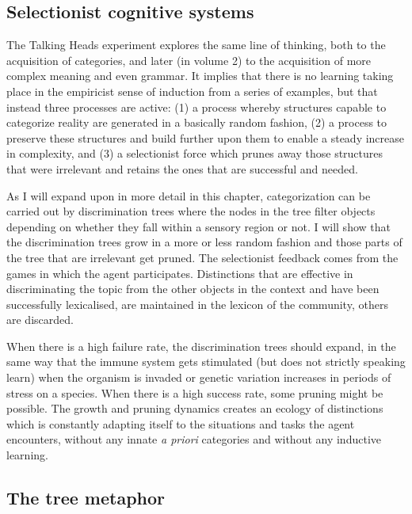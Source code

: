 \subsection{Selectionist cognitive systems}

The Talking Heads experiment explores the same line of thinking, 
both to the acquisition of categories, and later
(in volume 2) to the acquisition of more complex meaning 
and even grammar. It implies
that there is no learning taking place in the empiricist sense 
of induction from a series of examples, but that instead 
three processes are active: 
(1) a process whereby structures capable to categorize
reality are generated in a basically random fashion, 
(2) a process to preserve these structures and build 
further upon them to enable a steady increase in 
complexity, and (3) a selectionist force which
prunes away those structures that were irrelevant and 
retains the ones that are successful and needed. 

As I will expand upon in more detail in this 
chapter, categorization
can be carried out by discrimination trees where the 
nodes in the tree filter objects depending on whether they 
fall within a sensory region or not. I will show that
the discrimination trees grow in a more or
less random fashion and 
those parts of the tree that are irrelevant get pruned. 
The selectionist feedback comes from the games in which 
the agent participates. Distinctions that are effective
in discriminating the topic from the other objects in 
the context and have been successfully lexicalised, 
are maintained in the lexicon of the
community, others are discarded.

When there is a high failure rate, the discrimination trees 
should expand, in the same way that the immune system gets 
stimulated (but does not strictly speaking
learn) when the organism is
invaded or genetic variation increases in periods
of stress on a species. When there is a high
success rate, some pruning
might be possible. The growth and pruning dynamics creates an 
ecology of distinctions which is constantly 
adapting itself to the situations and tasks 
the agent encounters, without any innate {\it a priori}
categories and without any inductive learning. 

\subsection{The tree metaphor}


